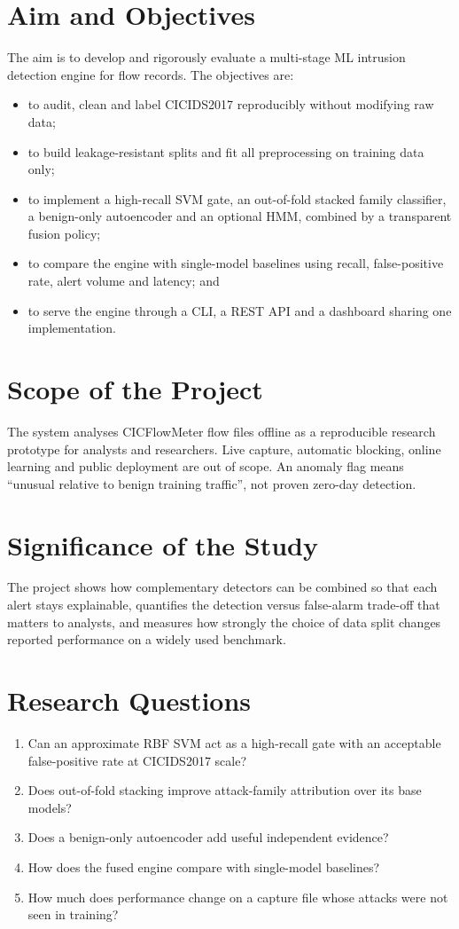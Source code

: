 \documentclass[12pt,a4paper,oneside]{report}
\begin{document}
\section{Aim and Objectives}
The aim is to develop and rigorously evaluate a multi-stage ML intrusion detection engine for flow records. The objectives are:
\begin{itemize}
    \item to audit, clean and label CICIDS2017 reproducibly without modifying raw data;
    \item to build leakage-resistant splits and fit all preprocessing on training data only;
    \item to implement a high-recall SVM gate, an out-of-fold stacked family classifier, a benign-only autoencoder and an optional HMM, combined by a transparent fusion policy;
    \item to compare the engine with single-model baselines using recall, false-positive rate, alert volume and latency; and
    \item to serve the engine through a CLI, a REST API and a dashboard sharing one implementation.
\end{itemize}

\section{Scope of the Project}
The system analyses CICFlowMeter flow files offline as a reproducible research prototype for analysts and researchers. Live capture, automatic blocking, online learning and public deployment are out of scope. An anomaly flag means ``unusual relative to benign training traffic'', not proven zero-day detection.

\section{Significance of the Study}
The project shows how complementary detectors can be combined so that each alert stays explainable, quantifies the detection versus false-alarm trade-off that matters to analysts, and measures how strongly the choice of data split changes reported performance on a widely used benchmark.

\section{Research Questions}
\begin{enumerate}[label=\textbf{RQ\arabic*.}, leftmargin=*]
    \item Can an approximate RBF SVM act as a high-recall gate with an acceptable false-positive rate at CICIDS2017 scale?
    \item Does out-of-fold stacking improve attack-family attribution over its base models?
    \item Does a benign-only autoencoder add useful independent evidence?
    \item How does the fused engine compare with single-model baselines?
    \item How much does performance change on a capture file whose attacks were not seen in training?
\end{enumerate}
\end{document}
